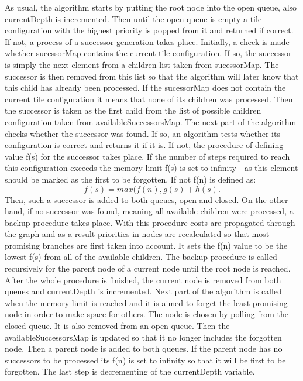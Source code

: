 \documentclass[12pt]{article}
\begin{document}
As usual, the algorithm starts by putting the root node into the open queue, also currentDepth is incremented. Then until the open queue is empty a tile configuration with the highest priority is popped from it and returned if correct. If not, a process of a successor generation takes place. Initially, a check is made whether sucessorMap contains the current tile configuration. If so, the successor is simply the next element from a children list taken from sucessorMap. The successor is then removed from this list so that the algorithm will later know that this child has already been processed. If the sucessorMap does not contain the current tile configuration it means that none of its children was processed. Then the successor is taken as the first child from the list of possible children configuration taken from availableSuccessorsMap.
The next part of the algorithm checks whether the successor was found. If so, an algorithm tests whether its configuration is correct and returns it if it is. If not, the procedure of defining value f(s) for the successor takes place. If the number of steps required to reach this configuration exceeds the memory limit f(s) is set to infinity - as this element should be marked as the first to be forgotten. If not f(n) is defined as:
\[
f(s) = max(f(n), g(s) + h(s).
\]
Then, such a successor is added to both queues, open and closed.
On the other hand, if no successor was found, meaning all available children were processed, a backup procedure takes place. With this procedure costs are propagated through the graph and as a result priorities in nodes are recalculated so that most promising branches are first taken into account. It sets the f(n) value to be the lowest f(s) from all of the available children. The backup procedure is called recursively for the parent node of a current node until the root node is reached. After the whole procedure is finished, the current node is removed from both queues and currentDepth is incremented.
Next part of the algorithm is called when the memory limit is reached and it is aimed to forget the least promising node in order to make space for others. The node is chosen by polling from the closed queue. It is also removed from an open queue. Then the availableSuccessorsMap is updated so that it no longer includes the forgotten node. Then a parent node is added to both queues. If the parent node has no successors to be processed its f(n) is set to infinity so that it will be first to be forgotten. The last step is decrementing of the currentDepth variable.
\end{document}
